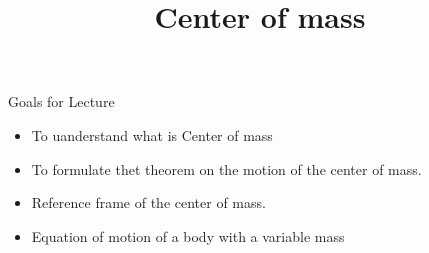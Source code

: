 \documentclass[18pt]{LectMechanics}
\title[Physics 1]{\huge\bfseries Center of mass}
\date{}
\begin{document}
%
\begin{frame}
	\titlepage
\end{frame}
\usebackgroundtemplate{
}




\begin{frame}{Goals for Lecture}{}
	\begin{itemize}
		\item To uanderstand what is Center of mass
		\item To formulate thet theorem on the motion of the center of mass.
		\item Reference frame of the center of mass.
		\item Equation of motion of a body with a variable mass
	\end{itemize}
\end{frame}
\end{document}

